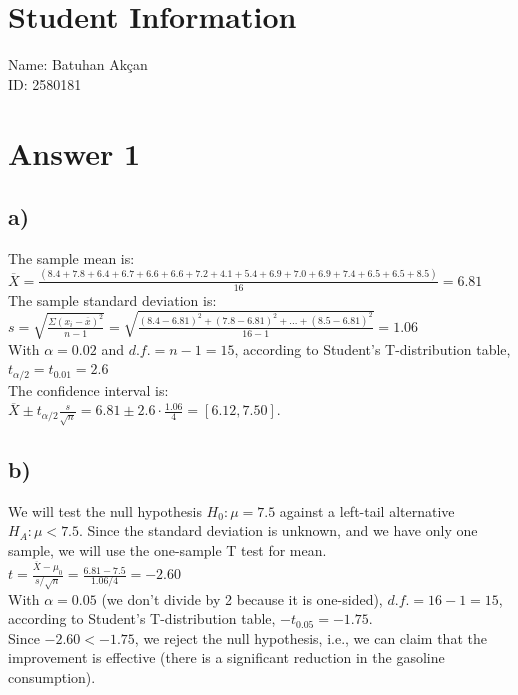 \documentclass{article}
\begin{document}
\section*{Student Information}
Name: Batuhan Akçan \\
ID: 2580181 \\

\section*{Answer 1}
\subsection*{a)}
The sample mean is:\vspace{0.2cm}\\ $\overline{X} = \frac{\left(8.4+7.8+6.4+6.7+6.6+6.6+7.2+4.1+5.4+6.9+7.0+6.9+7.4+6.5+6.5+8.5\right)}{16} = 6.81$\vspace{0.2cm}\\
The sample standard deviation is:\vspace{0.2cm}\\
$s = \sqrt{\frac{\Sigma (x_i-\overline{x})^2}{n-1}} = \sqrt{\frac{(8.4-6.81)^2+(7.8-6.81)^2+...+(8.5-6.81)^2}{16-1}} = 1.06$\vspace{0.2cm}\\
With $\alpha = 0.02$ and $d.f. = n-1 = 15$, according to Student's T-distribution table, $t_{\alpha/2} = t_{0.01} = 2.6$\vspace{0.2cm}\\
The confidence interval is:\vspace{0.2cm}\\
$\overline{X} \pm t_{\alpha/2}\frac{s}{\sqrt{n}} = 6.81 \pm 2.6\cdot \frac{1.06}{4} = [6.12,7.50]$.
\subsection*{b)}
We will test the null hypothesis $H_0: \mu = 7.5$ against a left-tail alternative $H_A: \mu < 7.5$. Since the standard deviation is unknown, and we have only one sample, we will use the one-sample T test for mean.\vspace{0.2cm}\\
$t = \frac{\overline{X}-\mu_0}{s/\sqrt{n}} = \frac{6.81-7.5}{1.06/4} = -2.60$\vspace{0.2cm}\\
With $\alpha = 0.05$ (we don't divide by 2 because it is one-sided), $d.f. = 16-1 = 15$, according to Student's T-distribution table, $-t_{0.05} = -1.75$.\vspace{0.2cm}\\
Since $-2.60 < -1.75$, we reject the null hypothesis, i.e., we can claim that the improvement is effective (there is a significant reduction in the gasoline consumption).
\end{document}
